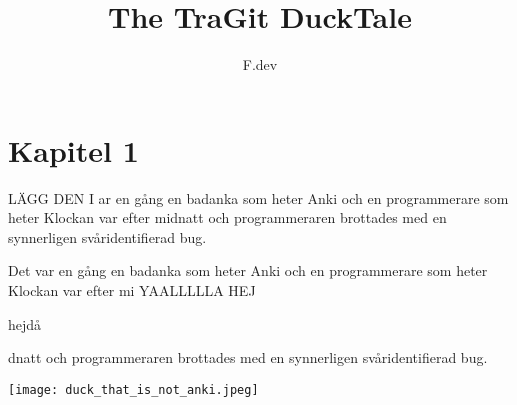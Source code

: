 \documentclass[a4paper]{article}
\begin{document}
\title{The TraGit DuckTale}
\author{F.dev}
\maketitle

\section*{Kapitel 1}

LÄGG DEN I ar en gång en badanka som heter Anki och en programmerare som heter %
Klockan var efter midnatt och programmeraren brottades med en synnerligen svåridentifierad bug.

Det var en gång en badanka som heter Anki och en programmerare som heter %
Klockan var efter mi
YAALLLLLA
HEJ

hejdå


dnatt och programmeraren brottades med en synnerligen svåridentifierad bug.


\begin{center}
	\texttt{[image: duck\_that\_is\_not\_anki.jpeg]}
\end{center}


\end{document}

